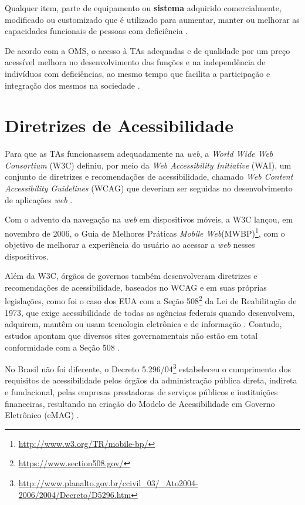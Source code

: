 \begin{citacao}
    Qualquer item, parte de equipamento ou \textbf{sistema} adquirido comercialmente, modificado ou customizado que é utilizado para aumentar, manter ou melhorar as capacidades
    funcionais de pessoas com deficiência \cite{Cook2014}.
\end{citacao}

De acordo com a OMS, o acesso à TAs adequadas e de qualidade por um preço acessível melhora
no desenvolvimento das funções e na independência de indivíduos com deficiências, ao mesmo tempo que facilita
a participação e integração dos mesmos na sociedade \cite{world2019global}.

\section{Diretrizes de Acessibilidade}

Para que as TAs funcionassem adequadamente na \emph{web}, a \textit{World Wide Web Consortium} (W3C) definiu, por meio da
\emph{Web Accessibility Initiative} (WAI), um conjunto de diretrizes e recomendações de acessibilidade, chamado
\emph{Web Content Accessibility Guidelines} (WCAG) que deveriam ser seguidas no desenvolvimento de aplicações \emph{web}
\cite{W3C2019}.

Com o advento da navegação na \emph{web} em dispositivos móveis, a W3C lançou, em novembro
de 2006, o Guia de Melhores Práticas \emph{Mobile Web}(MWBP)\footnote{\url{http://www.w3.org/TR/mobile-bp/}}, com o objetivo de
melhorar a experiência do usuário ao acessar a \emph{web} nesses dispositivos.

Além da W3C, órgãos de governos também desenvolveram diretrizes e recomendações de acessibilidade, baseados no WCAG e
em suas próprias legislações, como foi o caso dos EUA com a Seção 508\footnote{\url{https://www.section508.gov/}}
da Lei de Reabilitação de 1973, que exige acessibilidade de todas as agências federais quando desenvolvem,
adquirem, mantêm ou usam tecnologia eletrônica e de informação \cite{JAEGER2006169}. Contudo, estudos apontam que diversos
sites governamentais não estão em total conformidade com a Seção 508 \cite{KING2016715,YI201575}.

No Brasil não foi diferente, o Decreto 5.296/04\footnote{\url{http://www.planalto.gov.br/ccivil_03/_Ato2004-2006/2004/Decreto/D5296.htm}}
estabeleceu o cumprimento dos requisitos de acessibilidade pelos órgãos da administração pública direta, indireta e fundacional,
pelas empresas prestadoras de serviços públicos e instituições financeiras, resultando na criação do Modelo de Acessibilidade
em Governo Eletrônico (eMAG) \cite{EMAG_2007}.

